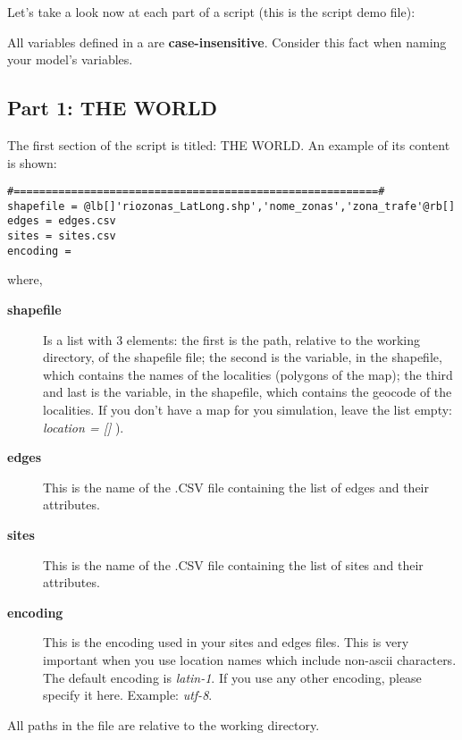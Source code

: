 \documentclass[a4paper,10pt]{manual}
\begin{document}
Let's take a look now at each part of a script (this is the script   demo file):

\begin{notice}[warning]
All variables defined in a  are \textbf{case-insensitive}. Consider this fact when naming your model's variables.
\end{notice}


\subsection{Part 1: THE WORLD}

The first section of the script is titled: THE WORLD. An example of its content is shown:

\begin{Verbatim}[commandchars=@\[\]]
#=========================================================#
shapefile = @lb[]'riozonas_LatLong.shp','nome_zonas','zona_trafe'@rb[]
edges = edges.csv
sites = sites.csv
encoding =
\end{Verbatim}

where,
\begin{description}
\item[\textbf{shapefile}]
Is a list with 3 elements: the first is  the path, relative to the working directory, of the shapefile file; the second  is the variable, in the shapefile, which contains the names of the localities (polygons of the map); the third and last is the variable, in the shapefile, which contains the geocode of the localities. If you don't have a map for you simulation, leave the list empty: \emph{location = {[}{]}} ).

\item[\textbf{edges}]
This is the name of the .CSV file containing the list of edges and their attributes.

\item[\textbf{sites}]
This is the name of the .CSV file containing the list of sites and their attributes.

\item[\textbf{encoding}]
This is the encoding used in your sites and edges files. This is very important when you use location names which include non-ascii characters. The default encoding is \emph{latin-1}. If you use any other encoding, please specify it here. Example: \emph{utf-8}.

\end{description}

\begin{notice}[note]
All paths in the  file are relative to the working directory.
\end{notice}
\end{document}
